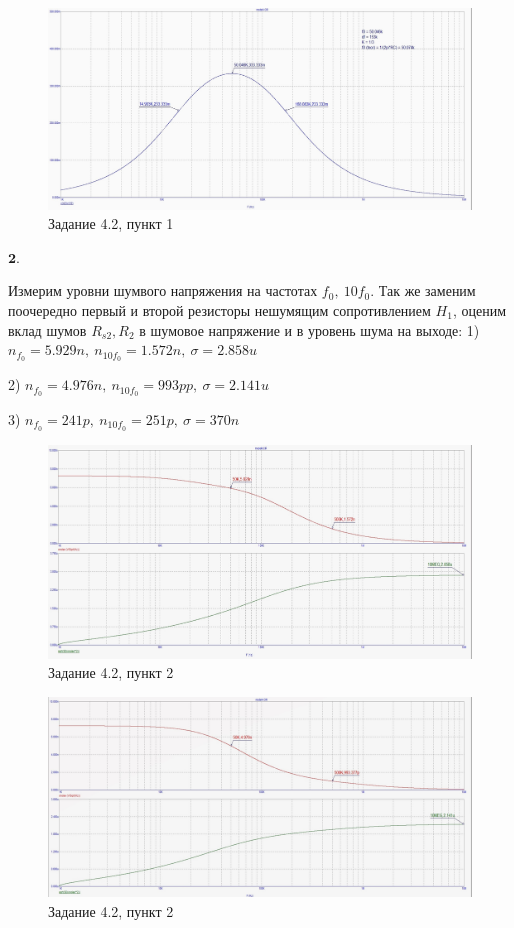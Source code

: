 \documentclass[a4paper, 14pt]{extarticle}%
\begin{document}
\begin{figure}[h!]
			\centering
			\includegraphics[width=1.1\linewidth]{4/4_2_2.jpg}
			\caption{Задание 4.2, пункт 1}
			\label{A}
\end{figure}


$\textbf{2.} $

Измерим уровни шумвого напряжения на частотах $f_0, \: 10f_0$. Так же заменим поочередно первый и второй резисторы нешумящим сопротивлением $H_1$, оценим вклад шумов $R_{s2}, R_2$ в шумовое напряжение и в уровень шума на выходе:
1) $n_{f_0} = 5.929n, \: n_{10f_0} = 1.572n, \: \sigma = 2.858u$

2) $n_{f_0} = 4.976n, \: n_{10f_0} = 993pp, \: \sigma = 2.141u$

3) $n_{f_0} = 241p, \: n_{10f_0} = 251p, \: \sigma = 370n$


\begin{figure}[h!]
			\centering
			\includegraphics[width=1.1\linewidth]{4/4_2_3.jpg}
			\caption{Задание 4.2, пункт 2}
			\label{A}
\end{figure}



\begin{figure}[h!]
			\centering
			\includegraphics[width=1.1\linewidth]{4/4_2_5.jpg}
			\caption{Задание 4.2, пункт 2}
			\label{A}
\end{figure}
\end{document}
